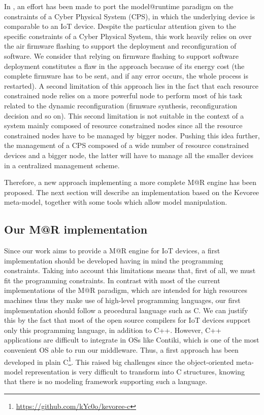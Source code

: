 In \cite{fouquet2012dynamic}, an effort has been made to port the model@runtime paradigm on the constraints of a Cyber Physical System (CPS), in which the underlying device is comparable to an IoT device.
Despite the particular attention given to the specific constraints of a Cyber Physical System, this work heavily relies on over the air firmware flashing to support the deployment and reconfiguration of software. 
We consider that relying on firmware flashing to support software deployment constitutes a flaw in the approach because of its energy cost (the complete firmware has to be sent, and if any error occurs, the whole process is restarted).
A second limitation of this approach lies in the fact that each resource constrained node relies on a more powerful node to perform most of his task related to the dynamic reconfiguration (firmware synthesis, reconfiguration decision and so on).
This second limitation is not suitable in the context of a system mainly composed of resource constrained nodes since all the resource constrained nodes have to be managed by bigger nodes.
Pushing this idea further, the management of a CPS composed of a wide number of resource constrained devices and a bigger node, the latter will have to manage all the smaller devices in a centralized management scheme.

Therefore, a new approach implementing a more complete M@R engine has been proposed.
The next section will describe an implementation based on the Kevoree meta-model, together with some tools which allow model manipulation.

\subsection{Our M@R implementation}
Since our work aims to provide a M@R engine for IoT devices, a first implementation should be developed having in mind the programming constraints.
Taking into account this limitations means that, first of all, we must fit the programming constraints.
In contrast with most of the current implementations of the M@R paradigm, which are intended for high resources machines thus they make use of high-level programming languages, our first implementation should follow a procedural language such as C.
We can justify this by the fact that most of the open source compilers for IoT devices support only this programming language, in addition to C++.
However, C++ applications are difficult to integrate in OSs like Contiki, which is one of the most convenient OS able to run our middleware.
Thus, a first approach has been developed in plain C\footnote{\url{https://github.com/kYc0o/kevoree-c}}.
This raised big challenges since the object-oriented meta-model representation is very difficult to transform into C structures, knowing that there is no modeling framework supporting such a language.

